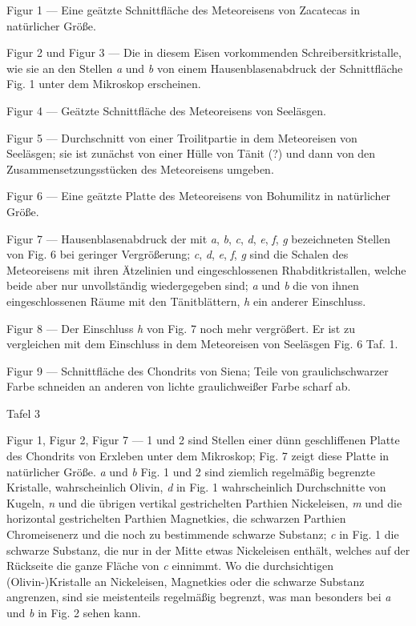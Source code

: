 \documentclass[a4paper, 11pt, oneside]{article}
\begin{document}
Figur 1 — Eine geätzte Schnittfläche des Meteoreisens von Zacatecas in natürlicher Größe.

Figur 2 und Figur 3 — Die in diesem Eisen vorkommenden Schreibersitkristalle, wie sie an den Stellen \emph{a} und \emph{b} von einem Hausenblasenabdruck der Schnittfläche Fig. 1 unter dem Mikroskop erscheinen.

Figur 4 — Geätzte Schnittfläche des Meteoreisens von Seeläsgen.

Figur 5 — Durchschnitt von einer Troilitpartie in dem Meteoreisen von Seeläsgen; sie ist zunächst von einer Hülle von Tänit (?) und dann von den Zusammensetzungsstücken des Meteoreisens umgeben.

Figur 6 — Eine geätzte Platte des Meteoreisens von Bohumilitz in natürlicher Größe.

Figur 7 — Hausenblasenabdruck der mit \emph{a}, \emph{b}, \emph{c}, \emph{d}, \emph{e}, \emph{f}, \emph{g} bezeichneten Stellen von Fig. 6 bei geringer Vergrößerung; \emph{c}, \emph{d}, \emph{e}, \emph{f}, \emph{g} sind die Schalen des Meteoreisens mit ihren Ätzelinien und eingeschlossenen Rhabditkristallen, welche beide aber nur unvollständig wiedergegeben sind; \emph{a} und \emph{b} die von ihnen eingeschlossenen Räume mit den Tänitblättern, \emph{h} ein anderer Einschluss.

Figur 8 — Der Einschluss \emph{h} von Fig. 7 noch mehr vergrößert. Er ist zu vergleichen mit dem Einschluss in dem Meteoreisen von Seeläsgen Fig. 6 Taf. 1.

Figur 9 — Schnittfläche des Chondrits von Siena; Teile von graulichschwarzer Farbe schneiden an anderen von lichte graulichweißer Farbe scharf ab.

Tafel 3

Figur 1, Figur 2, Figur 7 — 1 und 2 sind Stellen einer dünn geschliffenen Platte des Chondrits von Erxleben unter dem Mikroskop; Fig. 7 zeigt diese Platte in natürlicher Größe. \emph{a} und \emph{b} Fig. 1 und 2 sind ziemlich regelmäßig begrenzte Kristalle, wahrscheinlich Olivin, \emph{d} in Fig. 1 wahrscheinlich Durchschnitte von Kugeln, \emph{n} und die übrigen vertikal gestrichelten Parthien Nickeleisen, \emph{m} und die horizontal gestrichelten Parthien Magnetkies, die schwarzen Parthien Chromeisenerz und die noch zu bestimmende schwarze Substanz; \emph{c} in Fig. 1 die schwarze Substanz, die nur in der Mitte etwas Nickeleisen enthält, welches auf der Rückseite die ganze Fläche von \emph{c} einnimmt. Wo die durchsichtigen (Olivin-)Kristalle an Nickeleisen, Magnetkies oder die schwarze Substanz angrenzen, sind sie meistenteils regelmäßig begrenzt, was man besonders bei \emph{a} und \emph{b} in Fig. 2 sehen kann.
\end{document}
